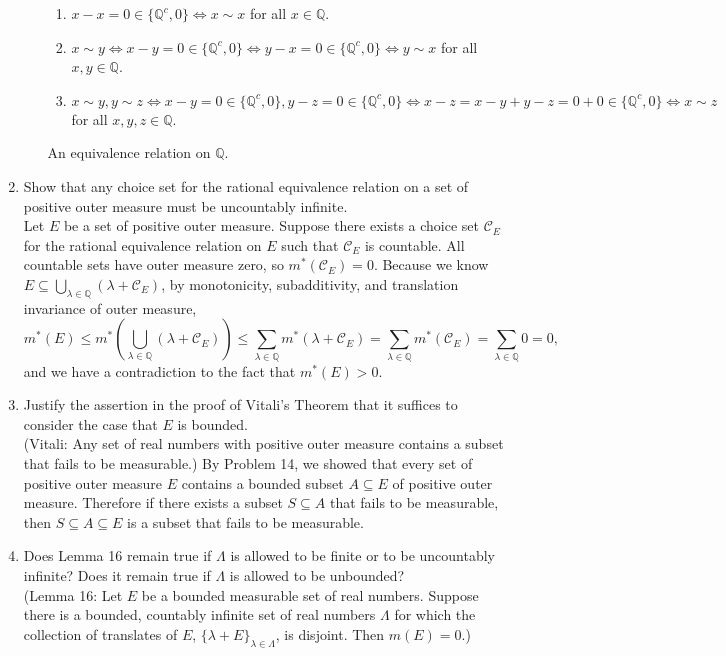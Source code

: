 \begin{enumerate}
\begin{enumerate}[label=(\roman*),align=left]
		\begin{enumerate}
			\item $x-x=0\in\{\mathbb{Q}^c,0\}\iff x\sim x$ for all $x\in \mathbb{Q}$.
			\item $x\sim y \iff x-y=0 \in\{\mathbb{Q}^c,0\}\iff y-x=0\in\{\mathbb{Q}^c,0\}\iff y\sim x$ for all $x,y\in \mathbb{Q}$.
			\item $x\sim y,y\sim z \iff x-y=0\in\{\mathbb{Q}^c,0\},y-z=0\in\{\mathbb{Q}^c,0\}\iff x-z=x-y+y-z=0+0\in\{\mathbb{Q}^c,0\}\iff x\sim z$ for all $x,y,z\in \mathbb{Q}$.
		\end{enumerate}
		An equivalence relation on $\mathbb{Q}$.
	\end{enumerate}
	\item Show that any choice set for the rational equivalence relation on a set of positive outer measure must be uncountably infinite.\\
	Let $E$ be a set of positive outer measure.
	Suppose there exists a choice set $\mathcal{C}_E$ for the rational equivalence relation on $E$ such that $\mathcal{C}_E$ is countable. 
	All countable sets have outer measure zero, so $m^*(\mathcal{C}_E)=0$.
	Because we know $E\subseteq\bigcup_{\lambda\in\mathbb{Q}}(\lambda+\mathcal{C}_E)$, by monotonicity, subadditivity, and translation invariance of outer measure,
	\[
		m^*(E)\le m^*(\bigcup_{\lambda\in\mathbb{Q}}(\lambda+\mathcal{C}_E))\le\sum_{\lambda\in\mathbb{Q}}m^*(\lambda+\mathcal{C}_E)=\sum_{\lambda\in\mathbb{Q}}m^*(\mathcal{C}_E)=\sum_{\lambda\in\mathbb{Q}}0=0,
	\]
	and we have a contradiction to the fact that $m^*(E)>0$.
	\item Justify the assertion in the proof of Vitali's Theorem that it suffices to consider the case that $E$ is bounded.\\
	(Vitali: Any set of real numbers with positive outer measure contains a subset that fails to be measurable.)
	By Problem 14, we showed that every set of positive outer measure $E$ contains a bounded subset $A\subseteq E$ of positive outer measure. Therefore if there exists a subset $S\subseteq A$ that fails to be measurable, then $S \subseteq A\subseteq E$ is a subset that fails to be measurable.
	\item Does Lemma 16 remain true if $\Lambda$ is allowed to be finite or to be uncountably infinite? Does it remain true if $\Lambda$ is allowed to be unbounded?\\
	(Lemma 16: Let $E$ be a bounded measurable set of real numbers. Suppose there is a bounded, countably infinite set of real numbers $\Lambda$ for which the collection of translates of $E$, $\{\lambda+E\}_{\lambda\in\Lambda}$, is disjoint. Then $m(E)=0$.)\\

\end{enumerate}
